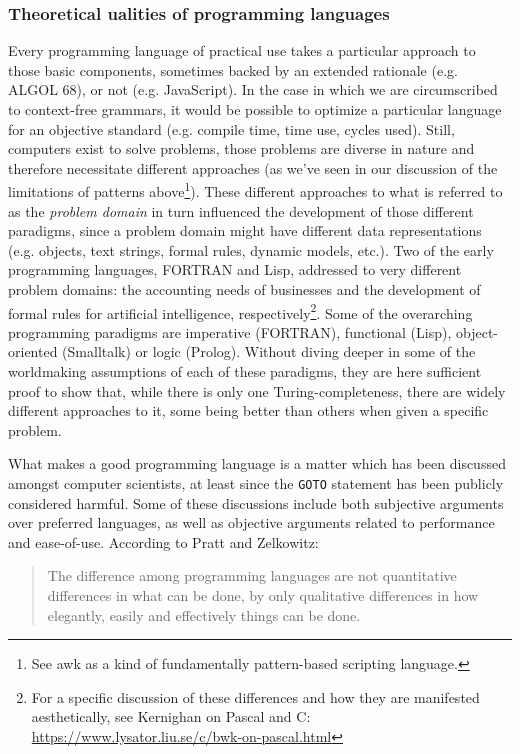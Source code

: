 \subsubsection{Theoretical ualities of programming languages}
\label{subsubsec:theoretical-qualities-programming-languages}

Every programming language of practical use takes a particular approach to those basic components, sometimes backed by an extended rationale (e.g. ALGOL 68), or not (e.g. JavaScript). In the case in which we are circumscribed to context-free grammars, it would be possible to optimize a particular language for an objective standard (e.g. compile time, time use, cycles used). Still, computers exist to solve problems, those problems are diverse in nature and therefore necessitate different approaches (as we've seen in our discussion of the limitations of patterns above\footnote{See awk as a kind of fundamentally pattern-based scripting language.}). These different approaches to what is referred to as the \emph{problem domain} in turn influenced the development of those different paradigms, since a problem domain might have different data representations (e.g. objects, text strings, formal rules, dynamic models, etc.). Two of the early programming languages, FORTRAN and Lisp, addressed to very different problem domains: the accounting needs of businesses and the development of formal rules for artificial intelligence, respectively\footnote{For a specific discussion of these differences and how they are manifested aesthetically, see Kernighan on Pascal and C: \url{https://www.lysator.liu.se/c/bwk-on-pascal.html}}. Some of the overarching programming paradigms are imperative (FORTRAN), functional (Lisp), object-oriented (Smalltalk) or logic (Prolog). Without diving deeper in some of the worldmaking assumptions of each of these paradigms, they are here sufficient proof to show that, while there is only one Turing-completeness, there are widely different approaches to it, some being better than others when given a specific problem.

What makes a good programming language is a matter which has been discussed amongst computer scientists, at least since the \lstinline{GOTO} statement has been publicly considered harmful. Some of these discussions include both subjective arguments over preferred languages, as well as objective arguments related to performance and ease-of-use. According to Pratt and Zelkowitz:

\begin{quote}
  The difference among programming languages are not quantitative differences in what can be done, by only qualitative differences in how elegantly, easily and effectively things can be done.\citep{pratt_programming_2000}
\end{quote}

